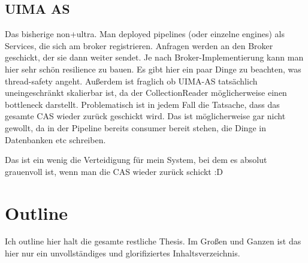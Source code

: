 \subsection{UIMA AS}
Das bisherige non+ultra. Man deployed pipelines (oder einzelne engines) als Services, die sich am broker registrieren. Anfragen werden an den Broker geschickt, der sie dann weiter sendet. Je nach Broker-Implementierung kann man hier sehr schön resilience zu bauen. Es gibt hier ein paar Dinge zu beachten, was thread-safety angeht. Außerdem ist fraglich ob UIMA-AS tatsächlich uneingeschränkt skalierbar ist, da der CollectionReader möglicherweise einen bottleneck darstellt. Problematisch ist in jedem Fall die Tatsache, dass das gesamte CAS wieder zurück geschickt wird. Das ist möglicherweise gar nicht gewollt, da in der Pipeline bereits consumer bereit stehen, die Dinge in Datenbanken etc schreiben.

Das ist ein wenig die Verteidigung für mein System, bei dem es absolut grauenvoll ist, wenn man die CAS wieder zurück schickt :D

\section{Outline}
Ich outline hier halt die gesamte restliche Thesis. Im Großen und Ganzen ist das hier nur ein unvollständiges und glorifiziertes Inhaltsverzeichnis.